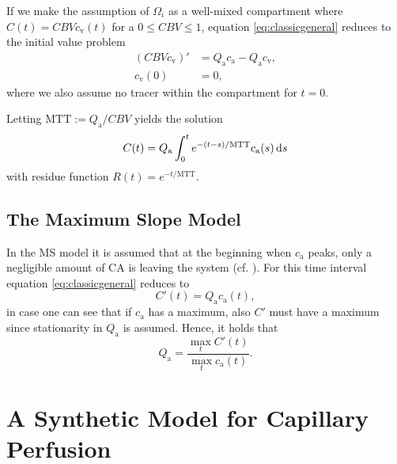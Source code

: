 \documentclass[paper=a4, fontsize=11pt,parskip=half,headings=small]{scrartcl}
\newcommand{\ca}{c_\mathrm{a}}
\newcommand{\MTT}{\mathrm{MTT}}
\newcommand{\cout}{c_{\mathrm{v}}}
\newcommand{\Pa}{Q_{\mathrm{a}}}
\begin{document}
	If we make the assumption of $\Omega_i$ as a well-mixed compartment where $C(t) = CBV\cout(t)$ for a $0 \le CBV \le 1$, equation \eqref{eq:classicgeneral} reduces to the initial value problem
	\begin{align*}
		(CBV \cout)' &= \Pa \ca - \Pa \cout, \\
		\cout(0)&=0,
	\end{align*}
	where we also assume no tracer within the compartment for $t = 0$. 
	
	Letting $\MTT:=\Pa/CBV$ yields the solution
	\begin{equation}
		C(t) = \Pa \int_0^t e^{-(t-s)/\MTT}\ca(s)\diffint s
		\label{eq:classicalperf}
	\end{equation}
	with residue function $R(t)=e^{-t/\MTT}$. 

	
	
	
	\subsection{The Maximum Slope Model}\label{sec:ms}	
	In the MS model it is assumed that at the beginning when $\ca$ peaks, only a negligible amount of CA is leaving the system (cf. \cite{klotz99}).
	For this time interval equation \eqref{eq:classicgeneral} reduces to 
	\begin{equation}
		C'(t) = \Pa\ca(t),
	\end{equation}
	in case one can see that if $\ca$ has a maximum, also $C'$ must have a maximum since stationarity in $\Pa$ is assumed.
	Hence, it holds that
	\begin{equation}\label{eq:MS}
		\Pa = \frac{\max_{t}C'(t)}{\max_{t}\ca(t)}.
	\end{equation}
	
	
	
	\section{A Synthetic Model for Capillary Perfusion}\label{sec:synthetic}
	
\end{document}
